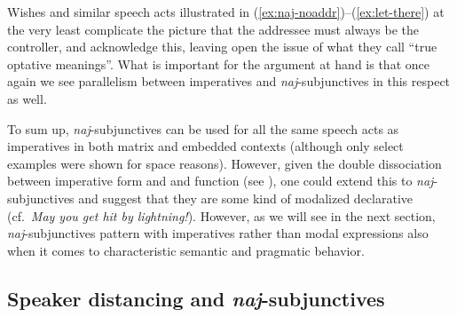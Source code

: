 \documentclass[output=paper,colorlinks,citecolor=brown]{langscibook}
\begin{document}
\ea {}\label{ex:naj-noaddr}
\z\z   
\ea\label{ex:let-there}
\z\z 
Wishes and similar speech acts illustrated in (\ref{ex:naj-noaddr})--(\ref{ex:let-there}) at the very least complicate the picture that the addressee must always be the controller, and \citeauthor{zpp12} acknowledge this, leaving open the issue of what they call ``true optative meanings''. What is important for the argument at hand is that once again we see parallelism between imperatives and \emph{naj}-subjunctives in this respect as well.  

To sum up, \emph{naj}-subjunctives can be used for all the same speech acts as imperatives in both matrix and embedded contexts (although only select examples were shown for space reasons). However, given the double dissociation between imperative form and and function (see ), one could extend this to \emph{naj}-subjunctives and suggest that they are some kind of modalized declarative (cf.\ \emph{May you get hit by lightning!}). However, as we will see in the next section, \emph{naj}-subjunctives pattern with imperatives rather than modal expressions also when it comes to characteristic semantic and pragmatic behavior. 

\subsection{Speaker distancing and \emph{naj}-subjunctives}
\label{subsec:distancing-naj}
\end{document}
